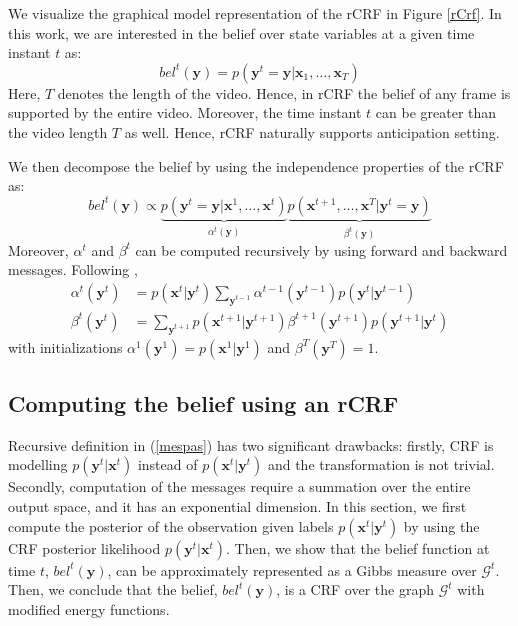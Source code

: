 We visualize the graphical model representation of the rCRF in Figure \ref{rCrf}. In this work, we are interested in the belief over state variables at a given time instant $t$ as:
\begin{equation}
bel^t(\mathbf{y}) = p(\mathbf{y}^t=\mathbf{y}|\mathbf{x}_1,\ldots,\mathbf{x}_T) \label{beldef}
\end{equation}
Here, $T$ denotes the length of the video. Hence, in rCRF the belief of any frame is supported by the entire video. Moreover, the time instant $t$ can be greater than the video length $T$ as well. Hence, rCRF naturally supports anticipation setting.

We then decompose the belief by using the independence properties of the rCRF as:
\begin{equation}
bel^t(\mathbf{y}) \propto  \underbrace{p(\mathbf{y}^t=\mathbf{y}|\mathbf{x}^1,\ldots,\mathbf{x}^t)}_{\alpha^t(\mathbf{y})} \underbrace{p(\mathbf{x}^{t+1},\ldots,\mathbf{x}^T|\mathbf{y}^t=\mathbf{y})}_{\beta^t(\mathbf{y})}
\label{beldec}
\end{equation}
Moreover, $\alpha^t$ and $\beta^t$ can be computed recursively by using forward and backward  messages. Following \cite{hmm},
\begin{equation}
\begin{aligned}
\alpha^t(\mathbf{y}^t) &= p(\mathbf{x}^t|\mathbf{y}^t)\sum_{\mathbf{y}^{t-1}} \alpha^{t-1}(\mathbf{y}^{t-1}) p(\mathbf{y}^{t}|\mathbf{y}^{t-1}) \\
\beta^t(\mathbf{y}^t) &= \sum_{\mathbf{y}^{t+1}} p(\mathbf{x}^{t+1}|\mathbf{y}^{t+1}) \beta^{t+1}(\mathbf{y}^{t+1}) p(\mathbf{y}^{t+1}|\mathbf{y}^{t})
\end{aligned}
\label{mespas}
\end{equation}
\noindent
with initializations $\alpha^1(\mathbf{y}^1)=p(\mathbf{x}^1|\mathbf{y}^1)$ and $\beta^T(\mathbf{y}^T)=1$.

\subsection{Computing the belief using an rCRF}
\label{fromto}
Recursive definition in (\ref{mespas}) has two significant drawbacks:
 firstly, CRF is modelling $p(\mathbf{y}^t|\mathbf{x}^t)$ instead of $p(\mathbf{x}^t|\mathbf{y}^t)$ and the transformation is not trivial. Secondly, computation of the messages require a summation over the entire output space, and it has an exponential dimension. In this section, we first compute the posterior of the observation given labels $p(\mathbf{x}^t|\mathbf{y}^t)$ by using the CRF posterior likelihood $p(\mathbf{y}^t|\mathbf{x}^t)$. Then, we show that the belief function at time $t$, $bel^t(\mathbf{y})$, can be approximately represented as a Gibbs measure over $\mathcal{G}^t$. Then, we conclude that the belief, $bel^t(\mathbf{y})$, is a CRF over the graph $\mathcal{G}^t$ with modified energy functions.
